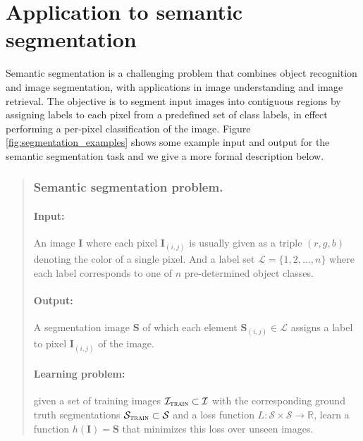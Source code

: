 \documentclass[a4paper,titlepage]{article}
\newcommand{\mat}[1]{\mathbf{#1}}
\begin{document}
\section{Application to semantic segmentation}





Semantic segmentation is a challenging problem that combines object recognition and image segmentation, with applications in image understanding and image retrieval. The objective is to segment input images into contiguous regions by assigning labels to each pixel from a predefined set of class labels, in effect performing a per-pixel classification of the image. Figure \ref{fig:segmentation_examples} shows some example input and output for the semantic segmentation task and we give a more formal description below.

\begin{quotation}
\subsubsection*{Semantic segmentation problem.}

\paragraph{Input:} An image $\mat{I}$ where each pixel $\mat{I}_{(i,j)}$ is usually given as a triple $(r,g,b)$ denoting the color of a single pixel. And a label set $\mathcal{L} = \{1, 2, \ldots, n\}$ where each label corresponds to one of $n$ pre-determined object classes.

\paragraph{Output:} A segmentation image $\mat{S}$ of which each element  $\mat{S}_{(i,j)} \in \mathcal{L}$ assigns a label to pixel $\mat{I}_{(i,j)}$ of the image.

\paragraph{Learning problem:} given a set of training images $\mathcal{I}_\textsc{train} \subset \mathcal{I}$ with the corresponding ground truth segmentations $\mathcal{S}_\textsc{train} \subset \mathcal{S}$ and a loss function $L: \mathcal{S} \times \mathcal{S} \rightarrow \mathbb{R}$, learn a function $h(\mat{I}) = \mat{S}$ that minimizes this loss over unseen images. %
\end{quotation}
\end{document}

